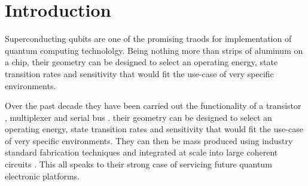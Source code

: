 
\section{Introduction}

Superconducting  qubits are  one of  the promising  traods for  implementation of
quantum computing  technololgy. Being nothing more  than strips of aluminum  on a
chip,  their geometry  can  be  designed to  select  an  operating energy,  state
transition rates  and sensitivity that  would fit  the use-case of  very specific
environments.

\noindent Over the past decade they have  been carried out the functionality of a
transistor  \cite{Astafiev2010}\cite{hoi2011}, multiplexer  \cite{honigl2018} and
serial bus \cite{shen2005}.
their geometry  can be designed to  select an operating energy,  state transition
rates   and  sensitivity   that  would   fit  the   use-case  of   very  specific
environments. They can then be  mass produced using industry standard fabrication
techniques   and    integrated   at   scale   into    large   coherent   circuits
\cite{johnson2010}.  This  all speaks  to their strong  case of  servicing future
quantum electronic platforms.


